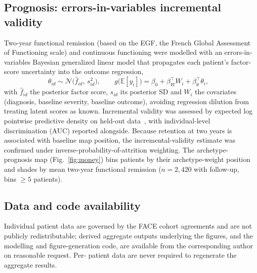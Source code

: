 \subsection{Prognosis: errors-in-variables incremental validity}
Two-year functional remission (based on the EGF, the French Global Assessment of Functioning scale)
and continuous functioning were modelled with an
errors-in-variables Bayesian generalized linear model that propagates each patient's factor-score
uncertainty into the outcome regression,
\begin{equation}
\theta_{id}\sim\mathcal N\!\big(\hat f_{id},\,s_{id}^{2}\big),\qquad
g\big(\mathbb E[y_i]\big)=\beta_0+\beta_W^{\top}W_i+\beta_\theta^{\top}\theta_i ,
\label{eq:m-eiv}
\end{equation}
with $\hat f_{id}$ the posterior factor score, $s_{id}$ its posterior SD and $W_i$ the covariates
(diagnosis, baseline severity, baseline outcome), avoiding regression dilution from treating latent
scores as known. Incremental validity was assessed by expected log pointwise predictive density on
held-out data~\citep{vehtari2017loo,watanabe2010waic}, with individual-level
discrimination (AUC) reported alongside. Because retention at two years is associated with baseline
map position, the incremental-validity estimate was confirmed under inverse-probability-of-attrition
weighting. The archetype-prognosis map (Fig.~\ref{fig:money}) bins
patients by their archetype-weight position and shades by mean two-year functional remission
($n=2{,}420$ with follow-up, bins $\ge 5$ patients).

\subsection{Data and code availability}
Individual patient data are governed by the FACE cohort agreements and are not publicly
redistributable; derived aggregate outputs underlying the figures, and the modelling and
figure-generation code, are available from the corresponding author on reasonable request. Per-%
patient data are never required to regenerate the aggregate results.
